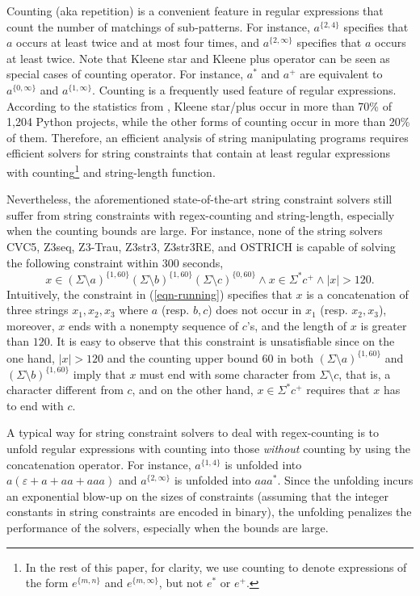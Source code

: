 Counting (aka repetition) is a convenient feature in regular expressions that count the number of matchings of sub-patterns. For instance, $a^{\{2, 4\}}$ specifies that $a$ occurs at least twice and at most four times, and $a^{\{2, \infty\}}$ specifies that $a$ occurs at least twice. 
Note that Kleene star and Kleene plus operator can be seen as special cases of counting operator. For instance, $a^*$ and $a^+$ are equivalent to $a^{\{0,\infty\}}$ and $a^{\{1,\infty\}}$.
Counting is a frequently used feature of regular expressions. According to the statistics from \cite{CS16}, Kleene star/plus occur in more than 70\% of 1,204 Python projects, while the other forms of counting occur in more than 20\% of them. Therefore, an efficient analysis of string manipulating programs requires efficient solvers for string constraints that contain at least regular expressions with counting\footnote{In the rest of this paper, for clarity, we use counting to denote expressions of the form $e^{\{m, n\}}$ and  $e^{\{m, \infty\}}$, but not $e^*$ or $e^+$.} and string-length function. 

Nevertheless, the aforementioned state-of-the-art string constraint solvers still suffer from string constraints with regex-counting and string-length, especially when the counting bounds are large. For instance, none of the string solvers CVC5, Z3seq, Z3-Trau, Z3str3, Z3str3RE, and OSTRICH is capable of solving the following constraint within 300 seconds,
%
\begin{equation}\label{eqn-running}
x \in (\Sigma \setminus a)^{\{1, 60\}} (\Sigma \setminus b)^{\{1, 60\}} (\Sigma \setminus c)^{\{0, 60\}} \wedge x \in \Sigma^* c^+ \wedge |x| > 120.
\end{equation}
Intuitively, the constraint in (\ref{eqn-running}) specifies that $x$ is a concatenation of three strings $x_1, x_2, x_3$ where $a$ (resp. $b, c$) does not occur in $x_1$ (resp. $x_2, x_3$), moreover, $x$ ends with a nonempty sequence of $c$'s, and the length of $x$ is greater than $120$. It is easy to observe that this constraint is unsatisfiable since on the one hand, $|x| > 120$ and the counting upper bound $60$ in both $(\Sigma \setminus a)^{\{1, 60\}}$ and $(\Sigma \setminus b)^{\{1, 60\}}$ imply that $x$ must end with some character from $\Sigma \setminus c$, that is, a character different from $c$, and on the other hand, $x \in \Sigma^*c^+$ requires that $x$ has to end with $c$.

A typical way for string constraint solvers to deal with regex-counting is to unfold regular expressions with counting into those \emph{without} counting by using the concatenation operator. For instance, $a^{\{1, 4\}}$ is unfolded into $a(\varepsilon + a + aa + aaa)$ and $a^{\{2,\infty\}}$ is unfolded into $aaa^{*}$. Since the unfolding incurs an exponential blow-up on the sizes of constraints (assuming that the integer constants in string constraints are encoded in binary), the unfolding penalizes the performance of the solvers, especially when the bounds are large. 

